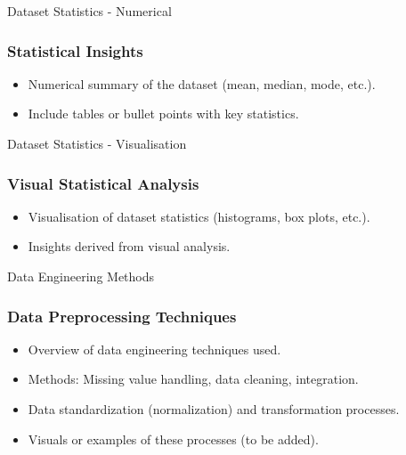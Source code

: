 \begin{frame}{Dataset Statistics - Numerical}
    \frametitle{Statistical Insights}
    \begin{itemize}
        \item Numerical summary of the dataset (mean, median, mode, etc.).
        \item Include tables or bullet points with key statistics.
    \end{itemize}
\end{frame}

\begin{frame}{Dataset Statistics - Visualisation}
    \frametitle{Visual Statistical Analysis}
    \begin{itemize}
        \item Visualisation of dataset statistics (histograms, box plots, etc.).
        \item Insights derived from visual analysis.
    \end{itemize}
\end{frame}

\begin{frame}{Data Engineering Methods}
    \frametitle{Data Preprocessing Techniques}
    \begin{itemize}
        \item Overview of data engineering techniques used.
        \item Methods: Missing value handling, data cleaning, integration.
        \item Data standardization (normalization) and transformation processes.
        \item Visuals or examples of these processes (to be added).
    \end{itemize}
\end{frame}

